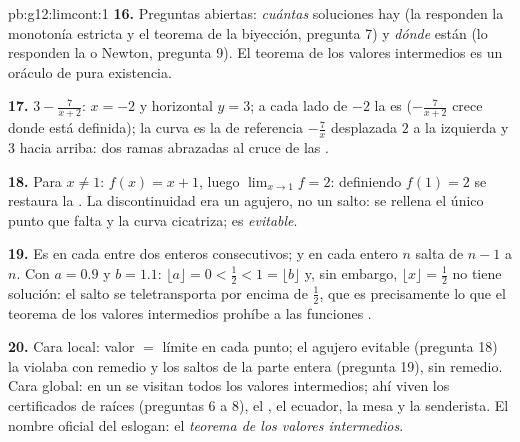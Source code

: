 \begin{solution}{pb:g12:limcont:1}
\textbf{16.} Preguntas abiertas: \emph{cuántas} soluciones hay (la
responden la monotonía estricta y el teorema de la biyección, pregunta 7)
y \emph{dónde} están (lo responden la  o Newton, pregunta 9). El
teorema de los valores intermedios es un oráculo de pura existencia.

\textbf{17.} $3 - \frac{7}{x + 2}$:  $x = -2$ y
horizontal $y = 3$; a cada lado de $-2$ la  es 
($-\frac{7}{x+2}$ crece donde está definida); la curva es la  de
referencia $-\frac7x$ desplazada $2$ a la izquierda y $3$ hacia arriba:
dos ramas abrazadas al cruce de las .

\textbf{18.} Para $x \neq 1$: $f(x) = x + 1$, luego
$\lim_{x \to 1} f = 2$: definiendo $f(1) = 2$ se restaura la .
La discontinuidad era un agujero, no un salto: se rellena el único punto
que falta y la curva cicatriza; es \emph{evitable}.

\textbf{19.} Es  en cada  entre dos enteros consecutivos;
y en cada entero $n$ salta de $n - 1$ a $n$. Con $a = 0.9$ y $b = 1.1$:
$\lfloor a \rfloor = 0 < \frac12 < 1 = \lfloor b \rfloor$ y, sin embargo,
$\lfloor x \rfloor = \frac12$ no tiene solución: el salto se teletransporta
por encima de $\frac12$, que es precisamente lo que el teorema de los
valores intermedios prohíbe a las funciones .

\textbf{20.} Cara local: valor $=$ límite en cada punto; el agujero
evitable (pregunta 18) la violaba con remedio y los saltos de la parte
entera (pregunta 19), sin remedio. Cara global: en un  se visitan
todos los valores intermedios; ahí viven los certificados de raíces
(preguntas 6 a 8), el , el ecuador, la mesa y la senderista. El
nombre oficial del eslogan: el \emph{teorema de los valores intermedios}.
\end{solution}
